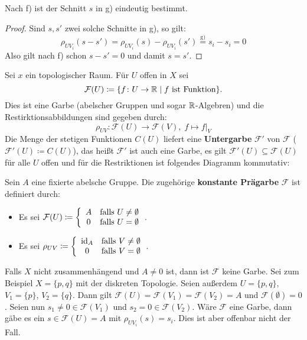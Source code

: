 \begin{bem}
	Nach f) ist der Schnitt $s$ in g) eindeutig bestimmt.
	\begin{proof}
		Sind $s, s'$ zwei solche Schnitte in g), so gilt:
		\[
			\rho_{UV_i}(s-s') = \rho_{UV_i}(s) - \rho_{UV_i}(s') \overset{\text{g)}}{=}s_i-s_i = 0 
		\]
		Also gilt nach f) schon $s-s'=0$ und damit $s=s'$.
	\end{proof}
\end{bem}

\begin{bsp}
\label{bsp:1.5}
	Sei $x$ ein topologischer Raum. Für $U$ offen in $X$ sei
	\[
		\mathcal{F}(U)\coloneqq \{f\colon U\to \mathbb {R} \mid f \text{ ist Funktion}\}.
	\]
	Dies ist eine Garbe (abelscher Gruppen und sogar $\mathbb {R}$-Algebren) und die Restirktionsabbildungen sind gegeben durch:
	\[
		\rho_{UV}\colon\mathcal{F}(U) \to \mathcal{F}(V),\; f \mapsto f\vert_V
	\]
	Die Menge der stetigen Funktionen $C(U)$ liefert eine \textbf{Untergarbe} $\mathcal{F}'$ von $\mathcal{F}$ ($\mathcal{F}'(U)\coloneqq C(U)$), das heißt $\mathcal{F}'$ ist auch eine Garbe, es gilt $\mathcal{F}'(U)\subseteq \mathcal{F}(U)$ für alle $U$ offen und für die Restriktionen ist folgendes Diagramm kommutativ:
	\begin{center}
	\end{center}

\end{bsp}

\begin{bsp}
	Sein $A$ eine fixierte abelsche Gruppe. Die zugehörige \textbf{konstante Prägarbe} $\mathcal{F}$ ist definiert durch:
	\begin{itemize}
		\item Es sei $\mathcal{F}(U) \coloneqq \left\lbrace \begin{array}{c c}A & \text{falls } U \neq \emptyset\\0& \text{falls } U = \emptyset\end{array}\right.$.
		\item Es sei $\rho_{UV} \coloneqq \left\lbrace \begin{array}{c c}\operatorname{id}_A & \text{falls } V \neq \emptyset\\0& \text{falls } V = \emptyset\end{array}\right.$.
	\end{itemize}
	Falls $X$ nicht zusammenhängend und $A \neq 0$ ist, dann ist $\mathcal{F}$ keine Garbe. Sei zum Beispiel $X=\{p,q\}$ mit der diskreten Topologie. Seien außerdem $U=\{p,q\}$, $V_1=\{p\}$, $V_2=\{q\}$. Dann gilt $\mathcal{F}(U)=\mathcal{F}(V_1)=\mathcal{F}(V_2) = A$ und $\mathcal{F}(\emptyset)=0$. Seien nun $s_1 \neq 0 \in \mathcal{F}(V_1)$ und $s_2 = 0 \in \mathcal{F}(V_2)$. Wäre $\mathcal{F}$ eine Garbe, dann gäbe es ein $s \in \mathcal{F}(U) = A$ mit $\rho_{UV_i}(s) = s_i$. Dies ist aber offenbar nicht der Fall.
\end{bsp}

